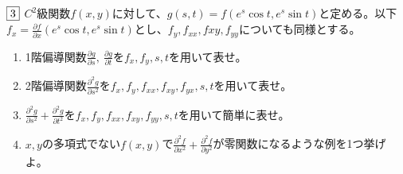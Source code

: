 \begin{tcolorbox} %
	$\fbox{3}$ $C^2$級関数$f(x, y)$に対して、$g(s, t)= f(e^s \cos{t}, e^s \sin{t})$と定める。以下$f_x= \frac{\partial f}{\partial x}(e^s \cos{t}, e^s \sin{t})$とし、$f_y, f_{xx}, f{xy}, f_{yy}$についても同様とする。
\begin{enumerate}
	\item 1階偏導関数$\frac{\partial g}{\partial s},\ \frac{\partial g}{\partial t}$を$f_x, f_y, s, t$を用いて表せ。
	\item 2階偏導関数$\frac{\partial^2 g}{\partial s^2}$を$f_x, f_y, f_{xx}, f_{xy}, f_{yx}, s, t$を用いて表せ。
	\item $\frac{\partial^2 g}{\partial s^2}+ \frac{\partial^2 g}{\partial t^2}$を$f_x, f_y, f_{xx}, f_{xy}, f_{yy}, s, t$を用いて簡単に表せ。
	\item $x, y$の多項式でない$f(x, y)$で$\frac{\partial^2 f}{\partial x^2}+ \frac{\partial^2 f}{\partial y^2}$が零関数になるような例を1つ挙げよ。
\end{enumerate}
\end{tcolorbox}

